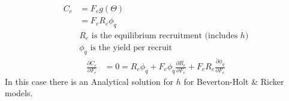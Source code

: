 \documentclass{beamer}
\begin{document}
\begin{frame}[fragile]
{\begin{align}
	C_e &= F_e g(\Theta)   \\
	    &= F_e R_e \phi_q \\
	&\mbox{$R_e$ is the equilibrium recruitment (includes $h$)}\nonumber \\
	&\mbox{$\phi_q$ is the yield per recruit} \nonumber 
\end{align}
\pause
\begin{align}
	\frac{\partial C_e}{\partial F_e}&= 0=
	R_e \phi_q + F_e \phi_q \frac{\partial R_e}{\partial F_e} + F_e R_e \frac{\partial \phi_q}{\partial F_e}
\end{align}
In this case there is an Analytical solution for $h$ for Beverton-Holt \& Ricker models.
}
\end{frame}
%
%
%
%
\end{document}
